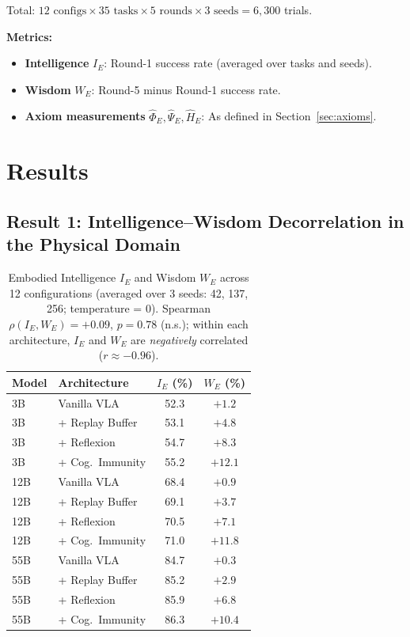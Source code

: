 \documentclass{article}
\begin{document}
Total: $12 \text{ configs} \times 35 \text{ tasks} \times 5 \text{ rounds} \times 3 \text{ seeds} = 6{,}300$ trials.

\textbf{Metrics:}
\begin{itemize}[leftmargin=*,itemsep=1pt]
    \item \textbf{Intelligence} $I_E$: Round-1 success rate (averaged over tasks and seeds).
    \item \textbf{Wisdom} $W_E$: Round-5 minus Round-1 success rate.
    \item \textbf{Axiom measurements} $\hat{\Phi}_E, \hat{\Psi}_E, \hat{H}_E$: As defined in Section~\ref{sec:axioms}.
\end{itemize}

\section{Results}
\label{sec:results}

\subsection{Result 1: Intelligence--Wisdom Decorrelation in the Physical Domain}

\begin{table}[t]
\centering
\caption{Embodied Intelligence $I_E$ and Wisdom $W_E$ across 12 configurations (averaged over 3 seeds: 42, 137, 256; temperature = 0). Spearman $\rho(I_E, W_E) = +0.09$, $p = 0.78$ (n.s.); within each architecture, $I_E$ and $W_E$ are \emph{negatively} correlated ($r \approx -0.96$).}
\label{tab:iw_embodied}
\begin{tabular}{llcc}
\toprule
\textbf{Model} & \textbf{Architecture} & $I_E$ (\%) & $W_E$ (\%) \\
\midrule
3B  & Vanilla VLA        & 52.3 & $+1.2$ \\
3B  & + Replay Buffer    & 53.1 & $+4.8$ \\
3B  & + Reflexion        & 54.7 & $+8.3$ \\
3B  & + Cog.\ Immunity   & 55.2 & $+12.1$ \\
\midrule
12B & Vanilla VLA        & 68.4 & $+0.9$ \\
12B & + Replay Buffer    & 69.1 & $+3.7$ \\
12B & + Reflexion        & 70.5 & $+7.1$ \\
12B & + Cog.\ Immunity   & 71.0 & $+11.8$ \\
\midrule
55B & Vanilla VLA        & 84.7 & $+0.3$ \\
55B & + Replay Buffer    & 85.2 & $+2.9$ \\
55B & + Reflexion        & 85.9 & $+6.8$ \\
55B & + Cog.\ Immunity   & 86.3 & $+10.4$ \\
\bottomrule
\end{tabular}
\end{table}
\end{document}
